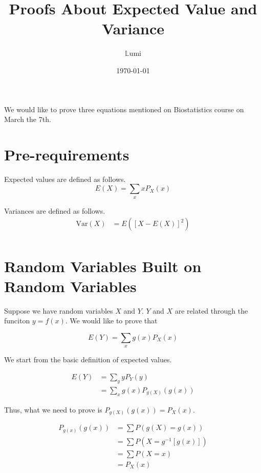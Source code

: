 \documentclass{article}
\title{Proofs About Expected Value and Variance}
\author{$\mathbb{L}$umi}
\date{\today}
\begin{document}
	
\maketitle

We would like to prove three equations mentioned on Biostatistics course on March the 7th.

\section{Pre-requirements}
Expected values are defined as follows.
\begin{equation}
	E(X) = \sum_x x P_X(x)
\end{equation}

Variances are defined as follows.
\begin{equation}
\begin{aligned}
	\mathrm{Var}(X) &= E([X - E(X)]^2) \\
\end{aligned}
\end{equation}

\section{Random Variables Built on Random Variables}

Suppose we have random variables $X$ and $Y$. $Y$ and $X$ are related through the funciton $y = f(x)$. We would like to prove that

\begin{equation}
	E(Y) = \sum_x g(x)P_X(x)
\end{equation}

We start from the basic definition of expected values.

\begin{equation}
\begin{aligned}
	E(Y) &= \sum_y y P_Y(y) \\
	&= \sum_x g(x) P_{g(X)}(g(x))
\end{aligned}
\end{equation}

Thus, what we need to prove is $P_{g(X)}(g(x)) = P_X(x)$.

\begin{equation}
\begin{aligned}
	P_{g(x)} (g(x)) &= \sum P(g(X) = g(x)) \\
	&= \sum P(X = g^{-1}[g(x)]) \\
	&= \sum P(X=x) \\
	&= P_X(x)
\end{aligned}	
\end{equation}
\end{document}
